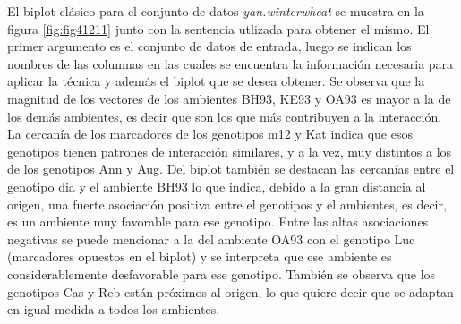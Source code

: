 El biplot clásico para el conjunto de datos \emph{yan.winterwheat} se muestra en la figura \ref{fig:fig41211} junto con la sentencia utlizada para obtener el mismo. El primer argumento es el conjunto de datos de entrada, luego se indican los nombres de las columnas en las cuales se encuentra la información necesaria para aplicar la técnica y además el biplot que se desea obtener. Se observa que la magnitud de los vectores de los ambientes BH93, KE93 y OA93 es mayor a la de los demás ambientes, es decir que son los que más contribuyen a la interacción. La cercanía de los marcadores de los genotipos m12 y Kat indica que esos genotipos tienen patrones de interacción similares, y a la vez, muy distintos a los de los genotipos Ann y Aug. Del biplot también se destacan las cercanías entre el genotipo dia y el ambiente BH93 lo que indica, debido a la gran distancia al origen, una fuerte asociación positiva entre el genotipos y el ambientes, es decir, es un ambiente muy favorable para ese genotipo.
Entre las altas asociaciones negativas se puede mencionar a la del ambiente OA93 con el genotipo Luc (marcadores opuestos en el biplot) y se interpreta que ese ambiente es considerablemente desfavorable para ese genotipo. También se observa que los genotipos Cas y Reb están próximos al origen, lo que quiere decir que se adaptan en igual medida a todos los ambientes.



